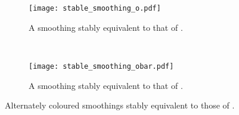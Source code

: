 \documentclass[10pt,oneside]{amsart}
\theoremstyle{definition}
\numberwithin{equation}{section}
\begin{document}
\begin{figure}
	\centering
	\begin{subfigure}[b]{0.4\textwidth}
		\begin{center}
			\texttt{[image: stable\_smoothing\_o.pdf]}
			\caption{A smoothing stably equivalent to that of .}
			\label{Fig:stable_smoothing_o}
		\end{center}
	\end{subfigure}
	~
	\begin{subfigure}[b]{0.4\textwidth}
		\begin{center}
			\texttt{[image: stable\_smoothing\_obar.pdf]}
			\caption{A smoothing stably equivalent to that of .}
			\label{Fig:stable_smoothing_obar}
		\end{center}
	\end{subfigure}
	\caption{Alternately coloured smoothings stably equivalent to those of .}\label{Fig:stablesmoothings}
\end{figure}
\end{document}
